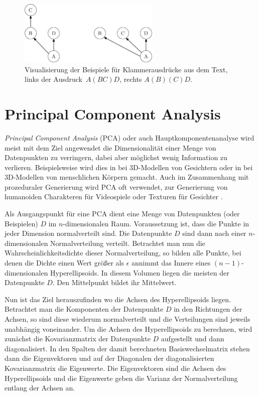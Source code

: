 \begin{figure}
 \centering
 \includegraphics[width=0.6\textwidth]{graphics/branchingExamples}
 \caption{Visualisierung der Beispiele für Klammerausdrücke aus dem Text,\\ links der \mbox{Ausdruck $A(BC)D$}, rechts $A(B)(C)D$.}
 \label{branching_examples}
\end{figure}


\section{Principal Component Analysis} %
\label{PCA}
 
 \emph{Principal Component Analysis} (PCA) oder auch Hauptkomponentenanalyse \cite{PCA} wird meist mit dem Ziel angewendet die Dimensionalität einer Menge von Datenpunkten zu verringern, dabei aber möglichst wenig Information zu verlieren.
 Beispielsweise wird dies in \cite{PCA_faces} bei 3D-Modellen von Gesichtern oder in \cite{PCA_bodies} bei 3D-Modellen von menschlichen Körpern gemacht. Auch im Zusammenhang mit prozeduraler Generierung wird PCA oft verwendet, \zb zur Generierung von humanoiden Charakteren für Videospiele \cite{ProceduralCharacterGeneration} oder Texturen für Gesichter \cite{GeneratingFacialTextures}.
 
 Als Ausgangspunkt für eine PCA dient eine Menge von Datenpunkten (oder Beispielen) $D$ im $n$-dimensionalen Raum. Voraussetzung ist, dass die Punkte in jeder Dimension normalverteilt sind. 
 Die Datenpunkte $D$ sind dann nach einer $n$-dimensionalen Normalverteilung verteilt. Betrachtet man nun die Wahrscheinlichkeitsdichte dieser Normalverteilung, so bilden alle Punkte, bei denen die Dichte einen Wert größer als $\epsilon$ annimmt das Innere eines $(n-1)$-dimensionalen Hyperellipsoids. In diesem Volumen liegen die meisten der Datenpunkte $D$. Den Mittelpunkt bildet ihr Mittelwert.
 
 Nun ist das Ziel herauszufinden wo die Achsen des Hyperellipsoids liegen. Betrachtet man die Komponenten der Datenpunkte $D$ in den Richtungen der Achsen, so sind diese wiederum normalverteilt und die Verteilungen sind jeweils unabhängig voneinander.
 Um die Achsen des Hyperellipsoids zu berechnen, wird zunächst die Kovarianzmatrix der Datenpunkte $D$ aufgestellt und dann diagonalisiert. In den Spalten der damit berechneten Basiswechselmatrix stehen dann die Eigenvektoren und auf der Diagonalen der diagonalisierten Kovarianzmatrix die Eigenwerte.
 Die Eigenvektoren sind die Achsen des Hyperellipsoids und die Eigenwerte geben die Varianz der Normalverteilung entlang der Achsen an.
 
